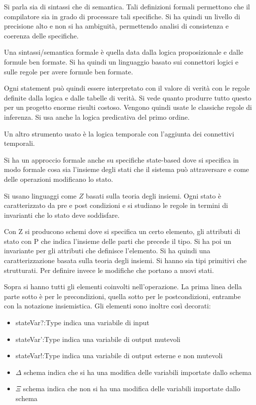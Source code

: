 Si parla sia di sintassi che di semantica. Tali definizioni formali permettono che il compilatore sia in grado di processare tali specifiche. Si ha quindi un livello di precisione alto e non si ha ambiguità, permettendo analisi di consistenza e coerenza delle specifiche.

Una sintassi/semantica formale è quella data dalla logica proposizionale e dalle formule ben formate. Si ha quindi un linguaggio basato sui connettori logici e sulle regole per avere formule ben formate.

Ogni statement può quindi essere interpretato con il valore di verità con le regole definite dalla logica e dalle tabelle di verità. Si vede quanto produrre tutto questo per un progetto enorme risulti costoso. Vengono quindi usate le classiche regole di inferenza. Si usa anche la logica predicativa del primo ordine.

Un altro strumento usato è la logica temporale con l'aggiunta dei connettivi temporali.

Si ha un approccio formale anche su specifiche state-based dove si specifica in modo formale cosa sia l'insieme degli stati che il sistema può attraversare e come delle operazioni modificano lo stato. 

Si usano linguaggi come $Z$ basati sulla teoria degli insiemi. Ogni stato è caratterizzato da pre e post condizioni e si studiano le regole in termini di invarianti che lo stato deve soddisfare.

Con Z si producono schemi dove si specifica un certo elemento, gli attributi di stato con P che indica l'insieme delle parti che precede il tipo. Si ha poi un invariante per gli attributi che definisce l'elemento. Si ha quindi una caratterizzazione basata sulla teoria degli insiemi. Si hanno sia tipi primitivi che strutturati. Per definire invece le modifiche che portano a nuovi stati.

Sopra si hanno tutti gli elementi coinvolti nell'operazione. La prima linea della parte sotto è per le precondizioni, quella sotto per le postcondizioni, entrambe con la notazione insiemistica. Gli elementi sono inoltre così decorati:
\begin{itemize}
\item stateVar?:Type indica una variabile di input
\item stateVar':Type indica una variabile di output mutevoli
\item stateVar!:Type indica una variabile di output esterne e non mutevoli
\item $\Delta$ schema indica che si ha una modifica delle variabili importate dallo schema
\item $\Xi$ schema indica che non si ha una modifica delle variabili importate dallo schema
\end{itemize}

